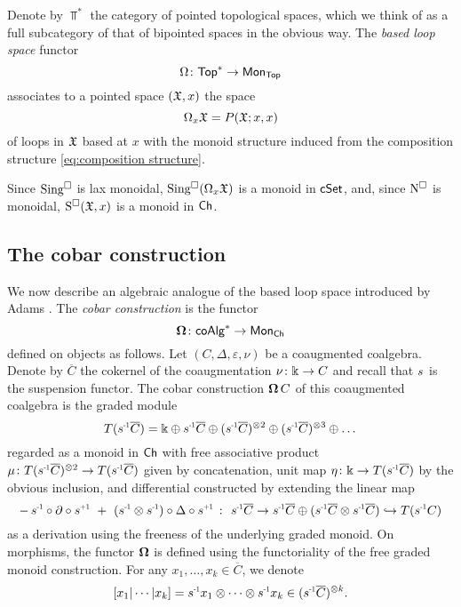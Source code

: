 Denote by $\Top^\ast$ the category of pointed topological spaces, which we think of as a full subcategory of that of bipointed spaces in the obvious way.
The \textit{based loop space} functor
\[
\Omega \colon \mathsf{Top}^\ast \to \mathsf{Mon}_{\mathsf{Top}}
\]
associates to a pointed space $(\mathfrak{X},x)$ the space
\[
\Omega_x \mathfrak{X} = P(\mathfrak{X};x,x)
\]
of loops in $\mathfrak{X}$ based at $x$ with the monoid structure induced from the composition structure \eqref{eq:composition structure}.


Since $\operatorname{Sing^{\square}}$ is lax monoidal, $\operatorname{Sing^{\square}}(\Omega_x \mathfrak{X})$ is a monoid in $\mathsf{cSet}$, and, since $\operatorname{N^{\square}}$ is monoidal, $\operatorname{S^{\square}}(\mathfrak{X},x)$ is a monoid in $\mathsf{Ch}$.

\subsection{The cobar construction}\label{ss:cobar construction}

We now describe an algebraic analogue of the based loop space introduced by Adams \cite{adams1956cobar}.
The \textit{cobar construction} is the functor
\[
\operatorname{\mathbf{\Omega}} \colon \mathsf{coAlg}^\ast \to \mathsf{Mon}_{\mathsf{Ch}}
\]
defined on objects as follows.
Let $(C, \Delta, \varepsilon, \nu)$ be a coaugmented coalgebra.
Denote by $\overline{C}$ the cokernel of the coaugmentation $\nu \colon \Bbbk \to C$ and recall that $\s{}$ is the suspension functor.
The cobar construction $\operatorname{\mathbf{\Omega}} C$ of this coaugmented coalgebra is the graded module
\[
T(\s{-1} \overline{C}) =
\k \oplus \s{-1}\overline{C} \oplus (\s{-1}\overline{C})^{\ot 2} \oplus (\s{-1}\overline{C})^{\ot 3} \oplus \dots
\]
regarded as a monoid in $\mathsf{Ch}$ with free associative product $\mu \colon T(\s{-1} \overline{C})^{\ot 2} \to T(\s{-1} \overline{C})$ given by concatenation, unit map $\eta \colon \k \to T(\s{-1} \overline{C})$ by the obvious inclusion, and differential constructed by extending the linear map
\[
-\, \s{-1} \circ \partial \circ \s{+1} \ + \ (\s{-1} \ot \s{-1}) \circ \Delta \circ \s{+1} \ \colon \
\s{-1} \overline{C} \to \s{-1}\overline{C} \oplus (\s{-1}\overline{C} \ot \s{-1}\overline{C}) \hookrightarrow T(\s{-1}C)
\]
as a derivation using the freeness of the underlying graded monoid.
On morphisms, the functor $\operatorname{\mathbf{\Omega}}$ is defined using the functoriality of the free graded monoid construction.
For any $x_1, \dots, x_k \in \overline{C}$, we denote
\[
[x_1| \cdots | x_k]= \s{-1} x_1 \otimes \cdots \otimes \s{-1}x_k \in (\s{-1}\overline{C})^{\otimes k}.
\]

